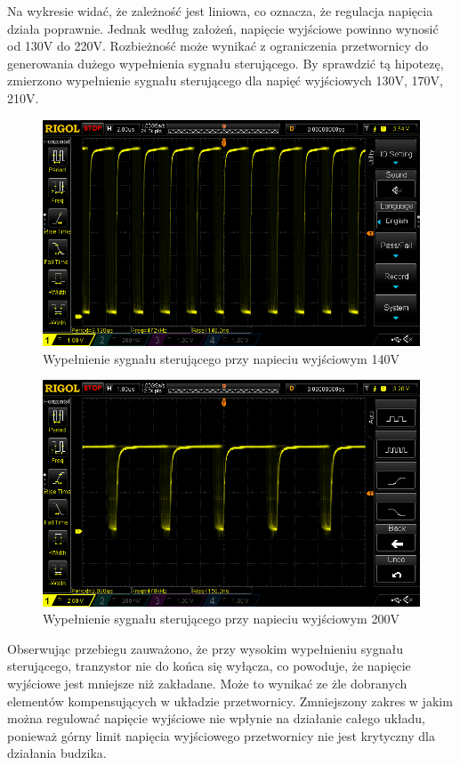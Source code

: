 \documentclass[../main.tex]{subfiles}
\begin{document}
Na wykresie widać, że zależność jest liniowa, co oznacza, że regulacja napięcia działa poprawnie.
Jednak według założeń, napięcie wyjściowe powinno wynosić od 130V do 220V.
Rozbieżność może wynikać z ograniczenia przetwornicy do generowania dużego wypełnienia sygnału sterującego.
By sprawdzić tą hipotezę, zmierzono wypełnienie sygnału sterującego dla napięć wyjściowych 130V, 170V, 210V.

\begin{figure}[H]
    \centering
    \includegraphics[width=1\textwidth]{duty_140.png}
    \caption{Wypełnienie sygnału sterującego przy napieciu wyjściowym 140V}
\end{figure}

\begin{figure}[H]
    \centering
    \includegraphics[width=1\textwidth]{duty_200.png}
    \caption{Wypełnienie sygnału sterującego przy napieciu wyjściowym 200V}
\end{figure}

Obserwując przebiegu zauważono, że przy wysokim wypełnieniu sygnału sterującego,
tranzystor nie do końca się wyłącza, co powoduje, że napięcie wyjściowe jest mniejsze niż zakładane.
Może to wynikać ze żle dobranych elementów kompensujących w układzie przetwornicy.
Zmniejszony zakres w jakim można regulować napięcie wyjściowe nie wpłynie na działanie całego układu,
ponieważ górny limit napięcia wyjściowego przetwornicy nie jest krytyczny dla działania budzika.
\end{document}
